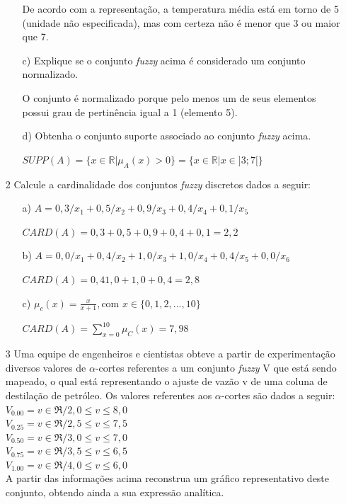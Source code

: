 \documentclass{report}
\begin{document}
\begin{enumerate}
\begin{enumerate}
    De acordo com a representação, a temperatura média está em torno de 5 (unidade não especificada), mas com certeza não
    é menor que 3 ou maior que 7. 

    \item[c)] Explique se o conjunto \emph{fuzzy} acima é considerado um conjunto normalizado.

    O conjunto é normalizado porque pelo menos um de seus elementos possui grau de pertinência igual a 1 (elemento 5).


    \item[d)] Obtenha o conjunto suporte associado ao conjunto \emph{fuzzy} acima.

    $SUPP(A) = \{ x \in  \mathbb{R} \vert \mu_A(x) > 0\} = \{ x \in \mathbb{R} \vert x \in ]3;7[ \}$

\end{enumerate}

\item[2] Calcule a cardinalidade dos conjuntos \emph{fuzzy} discretos dados a seguir:
\begin{enumerate}
    \item[a)] $A = 0,3/x_1 + 0,5/x_2 + 0,9/x_3 + 0,4/x_4 + 0,1/x_5$

    $CARD(A) = 0,3+0,5+0,9+0,4+0,1 = 2,2 $

    \item[b)] $A = 0,0/x_1 + 0,4/x_2 + 1,0/x_3 + 1,0/x_4 + 0,4/x_5 + 0,0/x_6$

    $CARD(A) = 0,4 1,0+ 1,0 + 0,4 = 2,8$


    \item[c)] $\mu_c(x)=\frac{x}{x+1}, \text{com } x \in \{0,1,2,...,10 \}$

    $ CARD(A) = \sum\limits_{x=0}^{10}\mu_C(x) = 7,98$ 

\end{enumerate}


\item[3] Uma equipe de engenheiros e cientistas obteve a partir de experimentação diversos valores de
$\alpha$-cortes referentes a um conjunto \emph{fuzzy} V que está sendo mapeado, o qual está representando o
ajuste de vazão v de uma coluna de destilação de petróleo. Os valores referentes aos $\alpha$-cortes são
dados a seguir:\\
$V_{0.00} = {v \in \Re / 2,0 \leq v \leq 8,0}$\\
$V_{0.25} = {v \in \Re / 2,5 \leq v \leq 7,5}$\\
$V_{0.50} = {v \in \Re / 3,0 \leq v \leq 7,0}$\\
$V_{0.75} = {v \in \Re / 3,5 \leq v \leq 6,5}$\\
$V_{1.00} = {v \in \Re / 4,0 \leq v \leq 6,0}$\\
A partir das informações acima reconstrua um gráfico representativo deste conjunto, obtendo
ainda a sua expressão analítica.



\end{enumerate}
\end{document}
